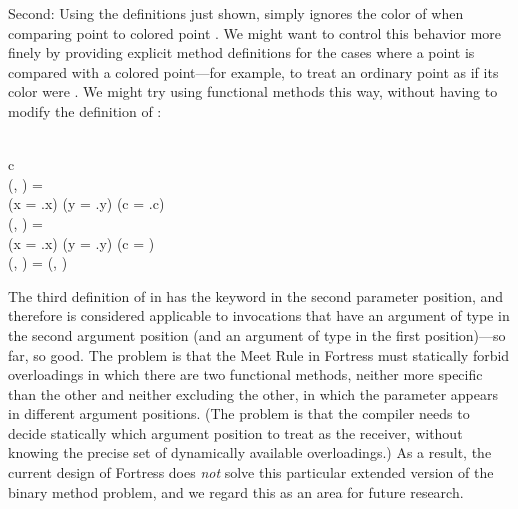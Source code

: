 Second: Using the definitions just shown,
 simply ignores the color of  when
comparing point  to colored point .
We might want to control this behavior more finely by providing
explicit method definitions for
the cases where a point is compared with a colored point---for example,
to treat an ordinary point as if its color were .
We might try using functional methods this way,
without having to modify the definition of :
\begin{codeexamplesize}
\begin{FortressCode}
   \fortresscommentsep   {} \\
\2\+c\COLON {} \\
  (, \COLON {})\COLON {} = \\
  \2\+(x = .x) \wedge (y = .y) \wedge (c = .c)\- \\
  (, \COLON {})\COLON {} = \\
  \2\+(x = .x) \wedge (y = .y) \wedge (c = )\- \\
  (\COLON {}, )\COLON {} = (, )\- \\
\end{FortressCode}
\end{codeexamplesize}
The third definition of  in 
has the  keyword in the second parameter position,
and therefore is considered applicable to invocations that have
an argument of type  in the second argument position
(and an argument of type  in the first position)---so far, so good.
The problem is that the Meet Rule in Fortress must statically forbid overloadings
in which there are two functional methods, neither more specific than the other
and neither excluding the other, in which the  parameter appears in different
argument positions.  (The problem is that the compiler needs to decide statically
which argument position to treat as the receiver, without knowing the precise set
of dynamically available overloadings.)  As a result, the current design of
Fortress does \emph{not} solve this particular extended version of the binary method
problem, and we regard this as an area for future research.

